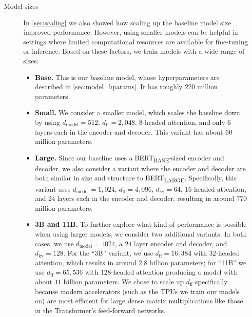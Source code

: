 \documentclass[twoside,11pt]{article}
\begin{document}
\begin{description}
\item[Model sizes] In \cref{sec:scaling} we also showed how scaling up the baseline model size improved performance.
However, using smaller models can be helpful in settings where limited computational resources are available for fine-tuning or inference.
Based on these factors, we train models with a wide range of sizes:
\begin{itemize}
  \item \textbf{Base.} This is our baseline model, whose hyperparameters are described in \cref{sec:model_hparams}. It has roughly $220$ million parameters.
  \item \textbf{Small.} We consider a smaller model, which scales the baseline down by using $d_{\mathrm{model}} = 512$, $d_{\mathrm{ff}} = 2{,}048$, $8$-headed attention, and only $6$ layers each in the encoder and decoder. This variant has about $60$ million parameters.
  \item \textbf{Large.} Since our baseline uses a BERT\textsubscript{BASE}-sized encoder and decoder, we also consider a variant where the encoder and decoder are both similar in size and structure to BERT\textsubscript{LARGE}. Specifically, this variant uses $d_{\mathrm{model}} = 1{,}024$, $d_{\mathrm{ff}} = 4{,}096$, $d_{\mathrm{kv}} = 64$, $16$-headed attention, and $24$ layers each in the encoder and decoder, resulting in around $770$ million parameters.
  \item \textbf{3B and 11B.} To further explore what kind of performance is possible when using larger models, we consider two additional variants. In both cases, we use $d_{\mathrm{model}} = 1024$, a $24$ layer encoder and decoder, and $d_{\mathrm{kv}} = 128$. For the ``3B'' variant, we use $d_{\mathrm{ff}} = 16{,}384$ with $32$-headed attention, which results in around $2.8$ billion parameters; for ``11B'' we use $d_{\mathrm{ff}} = 65{,}536$ with $128$-headed attention producing a model with about $11$ billion parameters. We chose to scale up $d_{\mathrm{ff}}$ specifically because modern accelerators (such as the TPUs we train our models on) are most efficient for large dense matrix multiplications like those in the Transformer's feed-forward networks.
\end{itemize}


\end{description}
\end{document}
